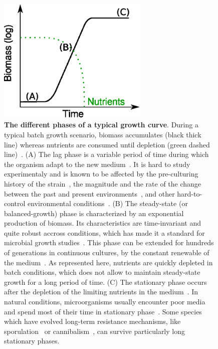 \begin{figure}[p]
\centering
\includegraphics[height=6cm]{./Fig/Chapter1/growth_curve.eps}
\caption{
\textbf{The different phases of a typical growth curve}.
During a typical batch growth scenario, biomass accumulates (black thick line) whereas nutrients are consumed until depletion (green dashed line)~\cite{schaechter_microbe_2006}.
(A) The lag phase is a variable period of time during which the organism adapt to the new medium~\cite{swinnen_predictive_2004}.
It is hard to study experimentaly and is known to be affected by the pre-culturing history of the strain~\cite{ng_damage_1962,dufrenne_effect_1997,shaw_effect_1967}, the magnitude and the rate of the change between the past and present environments~\cite{mcmeekin_predictive_2002}, and other hard-to-control environmental conditions~\cite{cheroutre-vialette_application_2002}.
(B) The steady-state (or balanced-growth) phase is characterized by an exponential production of biomass.
Its characteristics are time-invariant and quite robust accross conditions, which has made it a standard for microbial growth studies~\cite{schaechter_microbe_2006}.
This phase can be extended for hundreds of generations in continuous cultures, by the constant renewable of the medium~\cite{borirak_molecular_2014,herbert_continuous_1956,wang_robust_2010}.
As represented here, nutrients are quickly depleted in batch conditions, which does not allow to maintain steady-state growth for a long period of time.
(C) The stationary phase occurs after the depletion of the limiting nutrients in the medium~\cite{chubukov_environmental_2014,schaechter_microbe_2006}.
In natural conditions, microorganisms usually encounter poor media and spend most of their time in stationary phase~\cite{mcarthur_microbial_2006,menge_nitrogen_2012,hobbie_microbes_2013}.
Some species which have evolved long-term resistance mechanisms, like sporulation~\cite{stragier_molecular_1996} or cannibalism~\cite{gonzalez-pastor_cannibalism:_2011}, can survive particularly long stationary phases.
}
\label{fig:growth_curve}
\end{figure}

